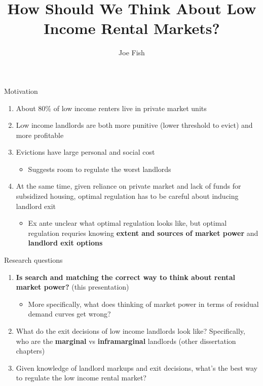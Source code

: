 \documentclass[10pt, xcolor=dvipsnames]{beamer}
\date{}
\title[Joe Fish Prospectus]{How Should We Think About Low Income Rental Markets?} %
\author[Joe Fish]{Joe Fish}
\begin{document}
\begin{frame}
\titlepage %
\end{frame}



\begin{frame}{Motivation}
    \begin{enumerate}
        \item About 80\% of low income renters live in private market units \parencite{jchs_2024, nhpd2024profiles}
        \pause
        \item Low income landlords are both more punitive (lower threshold to evict) and more profitable \parencite{Desmond_2019, Eisfeldt_2015,Damen_2025}
        \item Evictions have large personal and social cost \parencite{desmond-evicted,humphries2025, collison-et-al-2023}
        \begin{itemize}
            \item Suggests room to regulate the worst landlords
        \end{itemize}
        \pause
        \item At the same time, given reliance on private market and lack of funds for subsidized housing, optimal regulation has to be careful about inducing landlord exit
        \begin{itemize}
            \item Ex ante unclear what optimal regulation looks like, but optimal regulation requries knowing \textbf{extent and sources of market power} and \textbf{landlord exit options}
        \end{itemize}
    \end{enumerate}

\end{frame}

\begin{frame}{Research questions}

\begin{enumerate}
    \item \textbf{Is search and matching the correct way to think about rental market power?} (this presentation)
    \begin{itemize}
        \item More specifically, what does thinking of market power in terms of residual demand curves get wrong?
    \end{itemize}
    \pause
    \item What do the exit decisions of low income landlords look like? Specifically, who are the \textbf{marginal} vs \textbf{inframarginal} landlords (other dissertation chapters)
    \pause
    \item Given knowledge of landlord markups and exit decisions, what's the best way to regulate the low income rental market?
\end{enumerate}

\end{frame}
\end{document}
